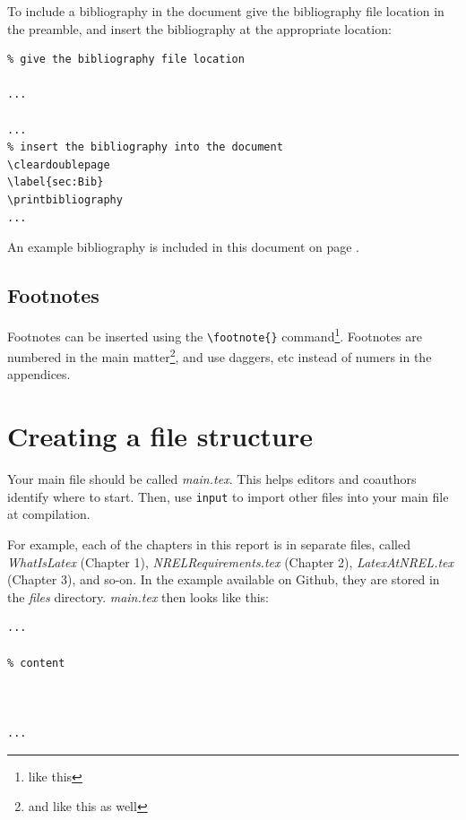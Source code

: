 To include a bibliography in the document give the bibliography file location in the preamble, and insert the bibliography at the appropriate location:

\begin{lstlisting}
% give the bibliography file location

...

...
% insert the bibliography into the document
\cleardoublepage
\label{sec:Bib}
\printbibliography
...

\end{lstlisting}

An example bibliography is included in this document on page \pageref{sec:Bib}.

\subsection{Footnotes}
Footnotes can be inserted using the \verb+\footnote{}+ command\footnote{like this}. Footnotes are numbered in the main matter\footnote{and like this as well}, and use daggers, etc instead of numers in the appendices.

\section{Creating a file structure}
\label{sec:FileStructure}
Your main file should be called \emph{main.tex}. This helps editors and coauthors identify where to start. Then, use \texttt{input} to import other files into your main file at compilation.

For example, each of the chapters in this report is in separate files, called \emph{WhatIsLatex} (Chapter 1), \emph{NRELRequirements.tex} (Chapter 2), \emph{LatexAtNREL.tex} (Chapter 3), and so-on. In the example available on Github, they are stored in the \emph{files} directory. \emph{main.tex} then looks like this:

\begin{lstlisting}
...

% content



...
\end{lstlisting}

